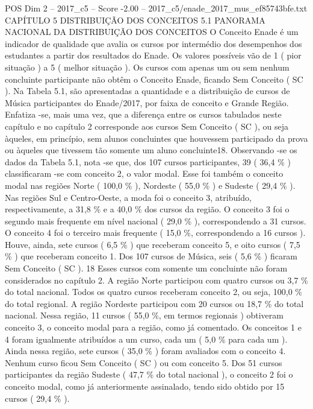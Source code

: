 \begin{textsample}{POS Dim 2 – 2017\_c5 – Score -2.00 – 2017\_c5/enade\_2017\_mus\_ef85743bfe.txt}  \label{ex:f2_pos_394}
CAPÍTULO 5 DISTRIBUIÇÃO DOS CONCEITOS 5.1 PANORAMA NACIONAL DA DISTRIBUIÇÃO DOS CONCEITOS O Conceito Enade é um indicador de qualidade que avalia os cursos por intermédio dos desempenhos dos estudantes a partir dos resultados do Enade.
Os valores possíveis vão de 1 ( pior situação ) a 5 ( melhor situação ).
Os cursos com apenas um ou sem nenhum concluinte participante não obtêm o Conceito Enade, ficando Sem Conceito ( SC ).
Na Tabela 5.1, são apresentadas a quantidade e a distribuição de cursos de Música participantes do Enade/2017, por faixa de conceito e Grande Região.
Enfatiza -se, mais uma vez, que a diferença entre os cursos tabulados neste capítulo e no capítulo 2 corresponde aos cursos Sem Conceito ( SC ), ou seja àqueles, em princípio, sem alunos concluintes que houvessem participado da prova ou àqueles que tivessem tão somente um aluno concluinte18.
Observando -se os dados da Tabela 5.1, nota -se que, dos 107 cursos participantes, 39 ( 36,4 \% ) classificaram -se com conceito 2, o valor modal.
Esse foi também o conceito modal nas regiões Norte ( 100,0 \% ), Nordeste ( 55,0 \% ) e Sudeste ( 29,4 \% ).
Nas regiões Sul e Centro-Oeste, a moda foi o conceito 3, atribuído, respectivamente, a 31,8 \% e a 40,0 \% dos cursos da região.
O conceito 3 foi o segundo mais frequente em nível nacional ( 29,0 \% ), correspondendo a 31 cursos.
O conceito 4 foi o terceiro mais frequente ( 15,0 \%, correspondendo a 16 cursos ).
Houve, ainda, sete cursos ( 6,5 \% ) que receberam conceito 5, e oito cursos ( 7,5 \% ) que receberam conceito 1.
Dos 107 cursos de Música, seis ( 5,6 \% ) ficaram Sem Conceito ( SC ). 18 Esses cursos com somente um concluinte não foram considerados no capítulo 2.
A região Norte participou com quatro cursos ou 3,7 \% do total nacional.
Todos os quatro cursos receberam conceito 2, ou seja, 100,0 \% do total regional.
A região Nordeste participou com 20 cursos ou 18,7 \% do total nacional.
Nessa região, 11 cursos ( 55,0 \%, em termos regionais ) obtiveram conceito 3, o conceito modal para a região, como já comentado.
Os conceitos 1 e 4 foram igualmente atribuídos a um curso, cada um ( 5,0 \% para cada um ).
Ainda nessa região, sete cursos ( 35,0 \% ) foram avaliados com o conceito 4.
Nenhum curso ficou Sem Conceito ( SC ) ou com conceito 5.
Dos 51 cursos participantes da região Sudeste ( 47,7 \% do total nacional ), o conceito 2 foi o conceito modal, como já anteriormente assinalado, tendo sido obtido por 15 cursos ( 29,4 \% ).

\end{textsample}
